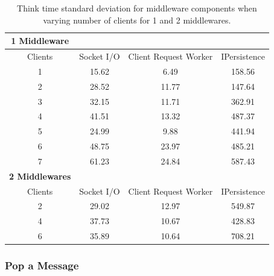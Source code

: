 \documentclass{article}
\begin{document}
            \begin{table}
            \begin{tabular}{|c|c|c|c|}
            \hline
            \textbf{1 Middleware} & & &\\
            \hline
            Clients & Socket I/O & Client Request Worker & IPersistence \\ \hline
            1&   15.62 &     6.49 &   158.56 \\ \hline  
            2&   28.52 &    11.77 &   147.64 \\ \hline  
            3&   32.15 &    11.71 &   362.91 \\ \hline  
            4&     41.51 &    13.32 &   487.37 \\ \hline  
            5&   24.99 &     9.88 &   441.94 \\ \hline  
            6&   48.75 &    23.97 &   485.21 \\ \hline  
            7&   61.23 &    24.84 &   587.43 \\ \hline      
            \textbf{2 Middlewares} & & & \\  
                \hline
                Clients &   Socket I/O & Client Request Worker & IPersistence \\ \hline
            2&  29.02 &    12.97 &   549.87 \\ \hline  
            4&  37.73 &    10.67 &   428.83 \\ \hline  
            6&  35.89 &    10.64 &   708.21 \\ \hline 
            \end{tabular}
            \caption{Think time standard deviation for middleware components when varying number of clients for 1 and 2 middlewares.}
            \label{table:thinktime_std_middleware_clients}
            \end{table}
        \subsubsection{Pop a Message}
        
\end{document}
